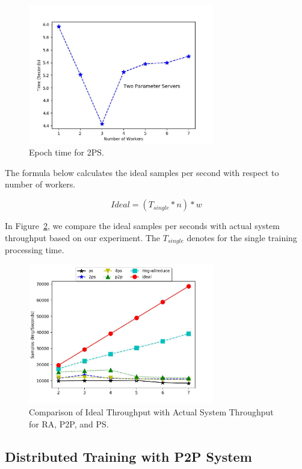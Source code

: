 \documentclass[conference]{IEEEtran}
\begin{document}
\begin{figure}[htb]
  \includegraphics[width=3.2in]{Fig/2pslatency.jpg}
  \caption{Epoch time for 2PS.}
  \label{fig:2pslatency}
\end{figure}


The formula below calculates the ideal samples per second with respect to number of workers. 

\begin{equation}
Ideal = (T_{single} * n) * w
\end{equation}

In Figure~\ref{fig:ideal}, we compare the ideal samples per seconds with actual system throughput based on our experiment. The $T_{single}$ denotes for the single training processing time. 

\begin{figure}[htb]
  \includegraphics[width=3.2in]{Fig/ideal.jpg}
  \caption{Comparison of Ideal Throughput with Actual System Throughput for RA, P2P, and PS.}
  \label{fig:ideal}
\end{figure}


\subsection{Distributed Training with P2P System}
\label{sec:permodelp2p}
\end{document}
